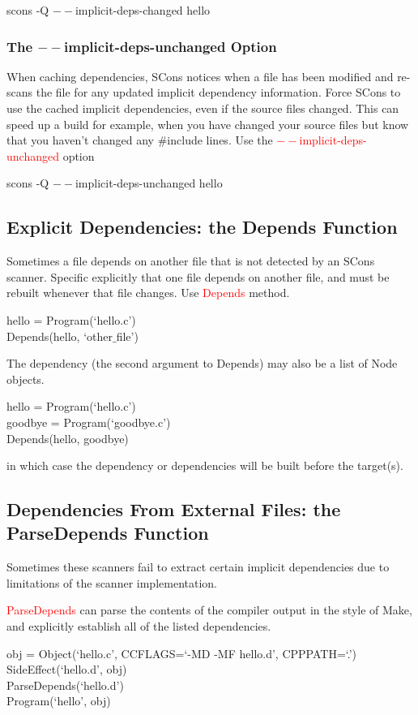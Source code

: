 \documentclass[12pt,a4paper]{article}
\begin{document}
scons -Q $--$implicit-deps-changed hello

\subsubsection{The $--$implicit-deps-unchanged Option}
When caching dependencies, SCons notices when a file has been modified and re-scans the file for any updated implicit dependency information. Force SCons to use the cached implicit dependencies, even if the source files changed. This can speed up a build for example, when you have changed your source files but know that you haven't changed any $\#$include lines. Use the \textcolor{red}{$--$implicit-deps-unchanged} option

scons -Q $--$implicit-deps-unchanged hello


\subsection{Explicit Dependencies: the Depends Function}
Sometimes a file depends on another file that is not detected by an SCons scanner. Specific explicitly that one file depends on another file, and must be rebuilt whenever that file changes. Use \textcolor{red}{Depends} method.

hello = Program(`hello.c') \\
Depends(hello, `other$\_$file')

The dependency (the second argument to Depends) may also be a list of Node objects.

hello = Program(`hello.c') \\
goodbye = Program(`goodbye.c') \\
Depends(hello, goodbye)

in which case the dependency or dependencies will be built before the target(s). 

\subsection{Dependencies From External Files: the ParseDepends Function}
Sometimes these scanners fail to extract certain implicit dependencies due to limitations of the scanner implementation.

\textcolor{red}{ParseDepends} can parse the contents of the compiler output in the style of Make, and explicitly establish all of the listed dependencies.

obj = Object(`hello.c', CCFLAGS=`-MD -MF hello.d', CPPPATH=`.') \\
SideEffect(`hello.d', obj) \\
ParseDepends(`hello.d') \\
Program(`hello', obj)
\end{document}
